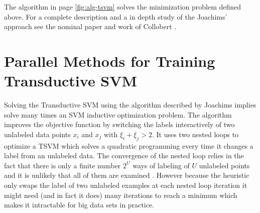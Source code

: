 The algorithm in page \ref{fig:alg-tsvm} solves the minimization problem defined above. For a complete description and a in depth study of the Joachims' approach see the nominal paper \cite{Joachims99c}
and work of Collobert \cite{1248609}.

%
\section{Parallel Methods for Training Transductive SVM \label{cha:Experiments-and-Results}}
%
Solving the Transductive SVM using the algorithm described by Joachims
implies solve many times an SVM inductive optimization problem. The
algorithm improves the objective function by switching the labels
interactively of two unlabeled data points $x_{i}$ and $x_{j}$ with
$\xi_{i}+\xi_{j}>2$. It uses two nested loops to optimize a TSVM
which solves a quadratic programming every time it changes a label
from an unlabeled data. The convergence of the nested loop relies
in the fact that there is only a finite number $2^{U}$ ways of labeling
of $U$ unlabeled points and it is unlikely that all of them are examined
\cite{1248609}. However because the heuristic only swaps the label
of two unlabeled examples at each nested loop iteration it might need
(and in fact it does) many iterations to reach a minimum which makes
it intractable for big data sets in practice.

